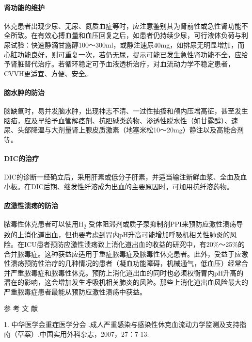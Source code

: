 \paragraph{肾功能的维护}

休克患者出现少尿、无尿、氮质血症等时，应注意鉴别其为肾前性或急性肾功能不全所致。在有效心搏血量和血压回复之后，如患者仍持续少尿，可行液体负荷与利尿试验：快速静滴甘露醇100～300ml，或静注速尿40mg，如排尿无明显增加，而心脏功能良好，则可重复一次，若仍无尿，提示可能已发生急性肾功能不全，应给予肾脏替代治疗。若循环稳定可予血液透析治疗，对血流动力学不稳定患者，CVVH更适宜、方便、安全。

\paragraph{脑水肿的防治}

脑缺氧时，易并发脑水肿，出现神志不清、一过性抽搐和颅内压增高征，甚至发生脑疝，应及早给予血管解痉剂、抗胆碱类药物、渗透性脱水性（如甘露醇）、速尿、头部降温与大剂量肾上腺皮质激素（地塞米松10～20mg）静注以及高能合剂等。

\paragraph{DIC的治疗}

DIC的诊断一经确立后，采用肝素或低分子肝素，并适当输注新鲜血浆、全血及血小板。在DIC后期、继发性纤溶成为出血的主要原因时，可加用抗纤溶药物。

\paragraph{应激性溃疡的防治}

脓毒性休克患者可以使用H\textsubscript{2}
受体阻滞剂或质子泵抑制剂PPI来预防应激性溃疡导致的上消化道出血，但也要考虑到胃内pH升高可能增加呼吸机相关性肺炎的风险。在ICU患者预防应激性溃疡致上消化道出血的收益的研究中，有20\%～25\%的合并脓毒症。这种获益应适用于重症脓毒症及脓毒性休克患者。此外，受益于应激性溃疡预防性治疗的几种情况的患者（凝血功能障碍，机械通气，低血压）经常合并严重脓毒症和脓毒性休克。预防上消化道出血的同时也必须权衡胃内pH升高的潜在的影响，这会增加发生呼吸机相关肺炎的风险。那些上消化道出血风险最大的严重脓毒症患者最能从预防应激性溃疡中获益。

\protect\hypertarget{text00058.html}{}{}

\hypertarget{text00058.htmlux5cux23CHP2-2-4}{}
参 考 文 献

1. 中华医学会重症医学分会
.成人严重感染与感染性休克血流动力学监测及支持指南（草案）.中国实用外科杂志，2007，27：7-13.

